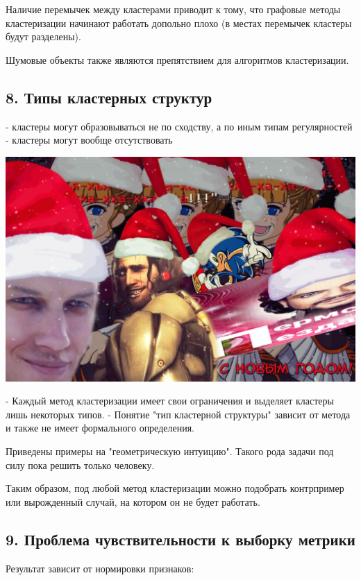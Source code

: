 Наличие перемычек между кластерами приводит к тому, что графовые методы
кластеризации начинают работать допольно плохо (в местах перемычек
кластеры будут разделены).

Шумовые объекты также являются препятствием для алгоритмов кластеризации.

\subsection{8. Типы кластерных структур}

- кластеры могут образовываться не по сходству, а по иным типам
регулярностей
- кластеры могут вообще отсутствовать

\includegraphics[scale=0.3]{figures/samplefigure.jpg}

- Каждый метод кластеризации имеет свои ограничения и выделяет кластеры
лишь некоторых типов.
- Понятие "тип кластерной структуры" зависит от метода и также не имеет
формального определения.

Приведены примеры на "геометрическую интуицию".
Такого рода задачи под силу пока решить только человеку.

Таким образом, под любой метод кластеризации можно подобрать контрпример
или вырожденный случай, на котором он не будет работать.

\subsection{9. Проблема чувствительности к выборку метрики}

Результат зависит от нормировки признаков:

